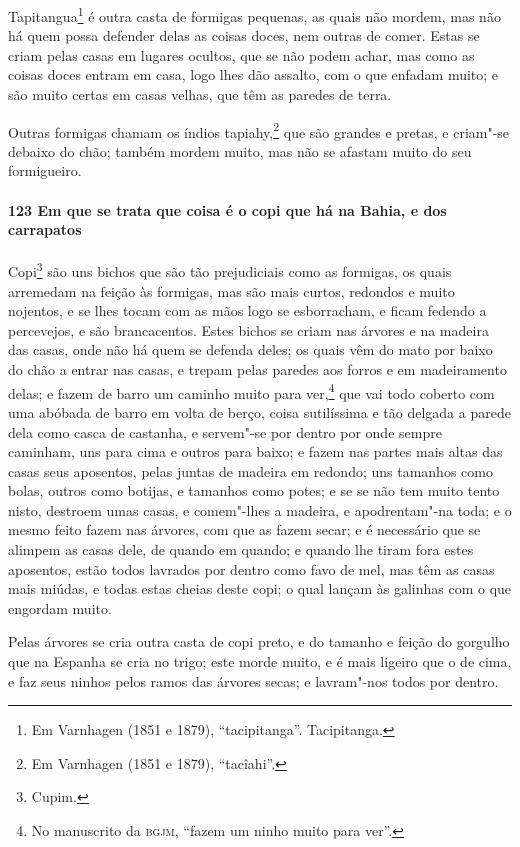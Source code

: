Tapitangua\footnote{ Em Varnhagen (1851 e 1879), ``tacipitanga''. Tacipitanga.} é outra
casta de formigas pequenas, as quais não mordem, mas não há quem possa defender delas as
coisas doces, nem outras de comer. Estas se criam pelas casas em lugares ocultos, que se
não podem achar, mas como as coisas doces entram em casa, logo lhes dão assalto, com o que
enfadam muito; e são muito certas em casas velhas, que têm as paredes de terra.

Outras formigas chamam os índios tapiahy,\footnote{ Em Varnhagen (1851 e 1879),
``tacîahi''.} que são grandes e pretas, e criam"-se debaixo do chão; também mordem muito,
mas não se afastam muito do seu formigueiro.

\paragraph{123 Em que se trata que coisa é o copi que há na Bahia, e dos carrapatos}

Copi\footnote{ Cupim.} são uns bichos que são tão prejudiciais como as formigas, os quais
arremedam na feição às formigas, mas são mais curtos, redondos e muito nojentos, e se lhes
tocam com as mãos logo se esborracham, e ficam fedendo a percevejos, e são brancacentos.
Estes bichos se criam nas árvores e na madeira das casas, onde não há quem se defenda
deles; os quais vêm do mato por baixo do chão a entrar nas casas, e trepam pelas paredes
aos forros e em madeiramento delas; e fazem de barro um caminho muito para ver,\footnote{
No manuscrito da \textsc{bgjm}, ``fazem um ninho muito para ver''.} que vai todo coberto
com uma abóbada de barro em volta de berço, coisa sutilíssima e tão delgada a parede dela
como casca de castanha, e servem"-se por dentro por onde sempre caminham, uns para cima e
outros para baixo; e fazem nas partes mais altas das casas seus aposentos, pelas juntas de
madeira em redondo; uns tamanhos como bolas, outros como botijas, e tamanhos como potes; e
se se não tem muito tento nisto, destroem umas casas, e comem"-lhes a madeira, e
apodrentam"-na toda; e o mesmo feito fazem nas árvores, com que as fazem secar; e é
necessário que se alimpem as casas dele, de quando em quando; e quando lhe tiram fora
estes aposentos, estão todos lavrados por dentro como favo de mel, mas têm as casas mais
miúdas, e todas estas cheias deste copi; o qual lançam às galinhas com o que engordam
muito.

Pelas árvores se cria outra casta de copi preto, e do tamanho e feição do gorgulho que na
Espanha se cria no trigo; este morde muito, e é mais ligeiro que o de cima, e faz seus
ninhos pelos ramos das árvores secas; e lavram"-nos todos por dentro.


